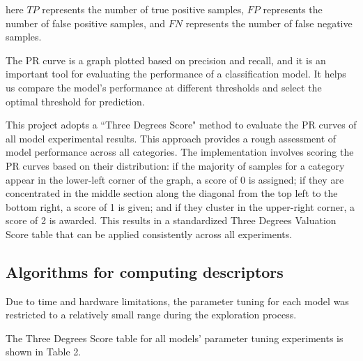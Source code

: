 \documentclass{article}
\begin{document}
  here $TP$ represents the number of true positive samples, $FP$ represents the number of false positive samples, and $FN$ represents the number of false negative samples.


The PR curve is a graph plotted based on precision and recall, and it is an important tool for evaluating the performance of a classification model. It helps us compare the model’s performance at different thresholds and select the optimal threshold for prediction.

This project adopts a “Three Degrees Score" method to evaluate the PR curves of all model experimental results. This approach provides a rough assessment of model performance across all categories. The implementation involves scoring the PR curves based on their distribution: if the majority of samples for a category appear in the lower-left corner of the graph, a score of 0 is assigned; if they are concentrated in the middle section along the diagonal from the top left to the bottom right, a score of 1 is given; and if they cluster in the upper-right corner, a score of 2 is awarded. This results in a standardized Three Degrees Valuation Score table that can be applied consistently across all experiments.

\subsection{Algorithms for computing descriptors}

Due to time and hardware limitations, the parameter tuning for each model was restricted to a relatively small range during the exploration process.

The Three Degrees Score table for all models' parameter tuning experiments is shown in Table 2.
\end{document}
